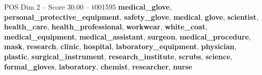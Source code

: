 \begin{textsample}{POS Dim 2 – Score 30.00 – t001595}  \label{ex:f2_pos_012}
\textbf{medical\_glove}, \textbf{personal\_protective\_equipment}, \textbf{safety\_glove}, \textbf{medical}, \textbf{glove}, \textbf{scientist}, \textbf{health\_care}, \textbf{health\_professional}, \textbf{workwear}, \textbf{white\_coat}, \textbf{medical\_equipment}, \textbf{medical\_assistant}, \textbf{surgeon}, \textbf{medical\_procedure}, \textbf{mask}, \textbf{research}, \textbf{clinic}, \textbf{hospital}, \textbf{laboratory\_equipment}, \textbf{physician}, \textbf{plastic}, \textbf{surgical\_instrument}, \textbf{research\_institute}, \textbf{scrubs}, \textbf{science}, \textbf{formal\_gloves}, \textbf{laboratory}, \textbf{chemist}, \textbf{researcher}, \textbf{nurse}

\end{textsample}
